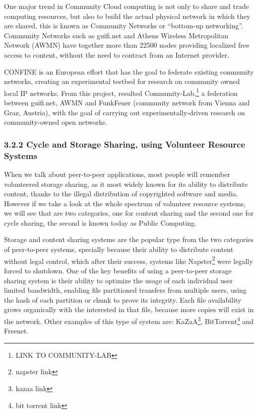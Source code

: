 One major trend in Community Cloud computing is not only to share and trade computing resources, but also to build the actual physical network in which they are shared, this is known as Community Networks or ``bottom-up networking''. Community Networks such as guifi.net and Athens Wireless Metropolitan Network (AWMN) have together more than 22500 nodes providing localized free access to content, without the need to contract from an Internet provider.

CONFINE\cite{Navarro} is an European effort that has the goal to federate existing community networks, creating an experimental testbed for research on community owned local IP networks. From this project, resulted Community-Lab,\footnote{LINK TO COMMUNITY-LAB} a federation between guifi.net, AWMN and FunkFeuer (community network from Vienna and Graz, Austria), with the goal of carrying out experimentally-driven research on community-owned open networks.



\subsubsection{3.2.2 Cycle and Storage Sharing, using Volunteer Resource Systems}

When we talk about peer-to-peer applications, most people will remember volunteered storage sharing, as it most widely known for its ability to distribute content, thanks to the illegal distribution of copyrighted software and media. However if we take a look at the whole spectrum of volunteer resource systems, we will see that are two categories, one for content sharing and the second one for cycle sharing, the second is known today as Public Computing.

Storage and content sharing systems are the popular type from the two categories of peer-to-peer systems, specially because their ability to distribute content without legal control, which after their success, systems like Napster\footnote{napster link} were legally forced to shutdown. One of the key benefits of using a peer-to-peer storage sharing system is their ability to optimize the usage of each individual user limited bandwidth, enabling file partitioned transfers from multiple users, using the hash of each partition or chunk to prove its integrity. Each file availability grows organically with the interested in that file, because more copies will exist in the network. Other examples of this type of system are: KaZaA\footnote{kazaa link}, BitTorrent\footnote{bit torrent link} and Freenet\cite{Clarke2001}.

